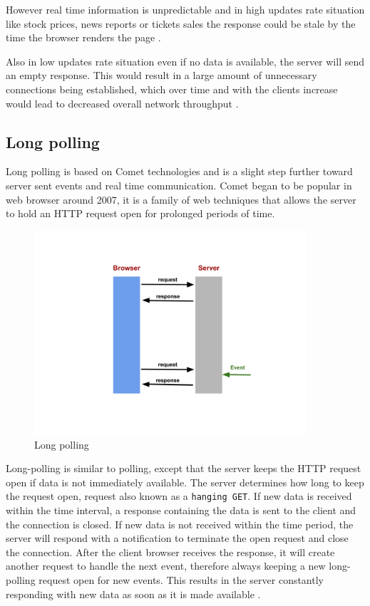 However real time information is unpredictable and in high updates rate
situation like stock prices, news reports or tickets sales the
response could be stale by the time the browser renders the page
\citep{Reference32}.

Also in low updates rate situation even if no data is available, the server
will send an empty response. This would result in a large amount of unnecessary
connections being established, which over time and with the clients increase
would lead to decreased overall network throughput \citep{Reference2}. 


\subsection{Long polling}

Long polling is based on Comet technologies and is a slight step further toward
server sent events and real time communication. Comet began to be popular in web
browser around 2007, it is a family of web techniques that allows the server to
hold an HTTP request open for prolonged periods of time.

\begin{figure}[H]
\centering
\includegraphics[width=0.9\textwidth]{./Figures/long_polling.png}
\caption[Long polling]{Long polling}
\label{fig:long_polling}
\end{figure}

Long-polling is similar to polling, except that the server keeps the HTTP
request open if data is not immediately available. The server determines how
long to keep the request open, request also known as a \texttt{hanging GET}. If
new data is received within the time interval, a response containing the data
is sent to the client and the connection is closed. If new data is not received
within the time period, the server will respond with a notification to
terminate the open request and close the connection. After the client browser
receives the response, it will create another  request to handle the next
event, therefore always keeping a new long-polling request open for new events.
This results in the server constantly responding with new data as soon as it is
made available \citep{Reference2}.

